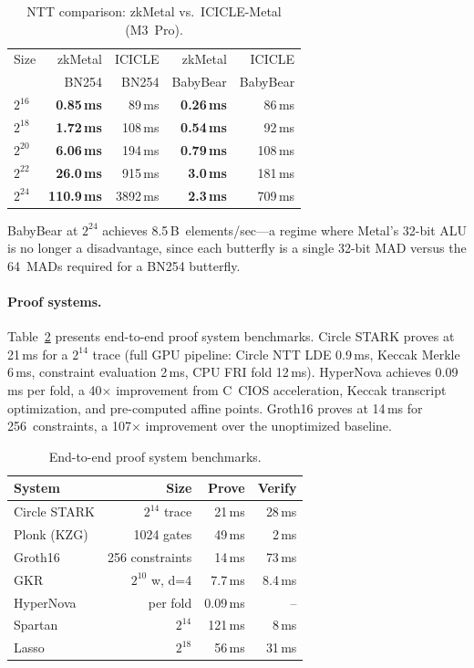 \begin{table}[t]
\centering
\small
\caption{NTT comparison: zkMetal vs.\ ICICLE-Metal (M3~Pro).}
\label{tab:ntt-comparison}
\begin{tabular}{lrrrr}
\toprule
Size & zkMetal & ICICLE & zkMetal & ICICLE \\
     & BN254   & BN254  & BabyBear & BabyBear \\
\midrule
$2^{16}$ & \textbf{0.85\,ms} & 89\,ms & \textbf{0.26\,ms} & 86\,ms \\
$2^{18}$ & \textbf{1.72\,ms}  & 108\,ms & \textbf{0.54\,ms} & 92\,ms \\
$2^{20}$ & \textbf{6.06\,ms}  & 194\,ms & \textbf{0.79\,ms} & 108\,ms \\
$2^{22}$ & \textbf{26.0\,ms}   & 915\,ms & \textbf{3.0\,ms}  & 181\,ms \\
$2^{24}$ & \textbf{110.9\,ms}  & 3892\,ms & \textbf{2.3\,ms} & 709\,ms \\
\bottomrule
\end{tabular}
\end{table}

BabyBear at $2^{24}$ achieves 8.5\,B~elements/sec---a regime where Metal's 32-bit ALU is no longer a disadvantage, since each butterfly is a single 32-bit MAD versus the 64~MADs required for a BN254 butterfly.

\paragraph{Proof systems.}
Table~\ref{tab:proof-systems} presents end-to-end proof system benchmarks.
Circle STARK proves at 21\,ms for a $2^{14}$ trace (full GPU pipeline: Circle NTT LDE 0.9\,ms, Keccak Merkle 6\,ms, constraint evaluation 2\,ms, CPU FRI fold 12\,ms).
HyperNova achieves 0.09\,ms per fold, a 40$\times$ improvement from C~CIOS acceleration, Keccak transcript optimization, and pre-computed affine points.
Groth16 proves at 14\,ms for 256~constraints, a 107$\times$ improvement over the unoptimized baseline.

\begin{table}[t]
\centering
\small
\caption{End-to-end proof system benchmarks.}
\label{tab:proof-systems}
\begin{tabular}{lrrr}
\toprule
System & Size & Prove & Verify \\
\midrule
Circle STARK & $2^{14}$ trace & 21\,ms & 28\,ms \\
Plonk (KZG) & 1024 gates & 49\,ms & 2\,ms \\
Groth16 & 256 constraints & 14\,ms & 73\,ms \\
GKR & $2^{10}$ w, d=4 & 7.7\,ms & 8.4\,ms \\
HyperNova & per fold & 0.09\,ms & -- \\
Spartan & $2^{14}$ & 121\,ms & 8\,ms \\
Lasso & $2^{18}$ & 56\,ms & 31\,ms \\
\bottomrule
\end{tabular}
\end{table}

